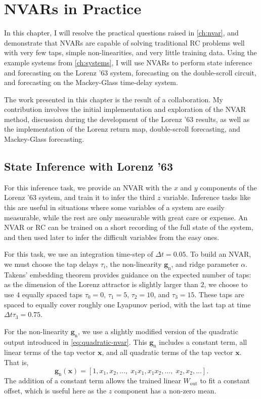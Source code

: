 \chapter{NVARs in Practice}\label{ch:nvar-application}

In this chapter, I will resolve the practical questions raised in
\cref{ch:nvar}, and demonstrate that NVARs are capable of solving
traditional RC problems well with very few taps, simple
non-linearities, and very little training data. Using the example
systems from \cref{ch:systems}, I will use NVARs to perform state
inference and forecasting on the Lorenz '63 system, forecasting on the
double-scroll circuit, and forecasting on the Mackey-Glass time-delay
system.

The work presented in this chapter is the result of a
collaboration\cite{gauthier2021}. My contribution involves the initial
implementation and exploration of the NVAR method, discussion during
the development of the Lorenz '63 results, as well as the
implementation of the Lorenz return map, double-scroll forecasting,
and Mackey-Glass forecasting.

\section{State Inference with Lorenz '63}

For this inference task, we provide an NVAR with the $x$ and $y$
components of the Lorenz '63 system, and train it to infer the third
$z$ variable. Inference tasks like this are useful in situations where
some variables of a system are easily measurable, while the rest are
only measurable with great care or expense. An NVAR or RC can be
trained on a short recording of the full state of the system, and then
used later to infer the difficult variables from the easy ones.

For this task, we use an integration time-step of $\Delta t = 0.05$. To
build an NVAR, we must choose the tap delays $\tau_i$, the
non-linearity $\bm{g}_\text{n}$, and ridge parameter $\alpha$. Takens'
embedding theorem\cite{takens1981} provides guidance on the expected
number of taps: as the dimension of the Lorenz attractor is slightly
larger than $2$, we choose to use $4$ equally spaced taps $\tau_0 =
0$, $\tau_1 = 5$, $\tau_2 = 10$, and $\tau_3 = 15$. These taps are
spaced to equally cover roughly one Lyapunov period, with the last tap
at time $\Delta t \tau_3 = 0.75$.

For the non-linearity $\bm{g}_\text{n}$, we use a slightly modified
version of the quadratic output introduced in
\cref{eq:quadratic-nvar}. This $\bm{g}_\text{n}$ includes a constant
term, all linear terms of the tap vector $\bm{x}$, and all quadratic
terms of the tap vector $\bm{x}$. That is,
\begin{equation}
  \label{eq:quadratic-nvar-const}
  \bm{g}_\text{n}(\bm{x}) = [1, x_1, x_2, \dots, \; x_1 x_1, x_1 x_2, \dots, \; x_2, x_2, \dots].
\end{equation}
The addition of a constant term allows the trained linear
$W_\text{out}$ to fit a constant offset, which is useful here as the
$z$ component has a non-zero mean.

